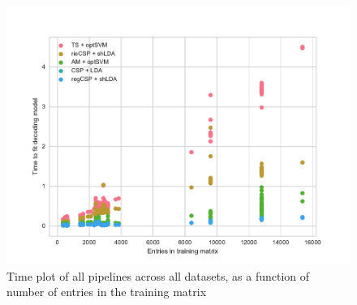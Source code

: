 \begin{figure}
  \centering
  \includegraphics[width=\textwidth]{Figures/time2d.pdf}
  \caption{Time plot of all pipelines across all datasets, as a
    function of number of entries in the training matrix}
  \label{fig:time}
\end{figure}

